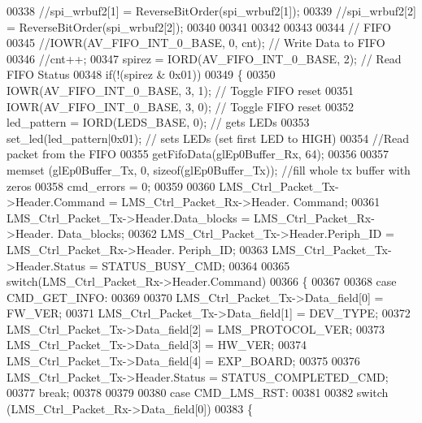 \begin{DoxyCode}
00338         \textcolor{comment}{//spi\_wrbuf2[1] = ReverseBitOrder(spi\_wrbuf2[1]);}
00339         \textcolor{comment}{//spi\_wrbuf2[2] = ReverseBitOrder(spi\_wrbuf2[2]);}
00340 
00341 
00342 
00343 
00344         \textcolor{comment}{// FIFO}
00345         \textcolor{comment}{//IOWR(AV\_FIFO\_INT\_0\_BASE, 0, cnt);     // Write Data to FIFO}
00346         \textcolor{comment}{//cnt++;}
00347         spirez = IORD(AV_FIFO_INT_0_BASE, 2);   \textcolor{comment}{// Read FIFO Status}
00348         \textcolor{keywordflow}{if}(!(spirez & 0x01))
00349         \{
00350             IOWR(AV_FIFO_INT_0_BASE, 3, 1);     \textcolor{comment}{// Toggle FIFO reset}
00351             IOWR(AV_FIFO_INT_0_BASE, 3, 0);     \textcolor{comment}{// Toggle FIFO reset}
00352             led\_pattern = IORD(LEDS_BASE, 0);   \textcolor{comment}{// gets LEDs}
00353             set_led(led\_pattern|0x01);         \textcolor{comment}{// sets LEDs (set first LED to HIGH)}
00354             \textcolor{comment}{//Read packet from the FIFO}
00355             getFifoData(glEp0Buffer_Rx, 64);
00356 
00357             memset (glEp0Buffer_Tx, 0, \textcolor{keyword}{sizeof}(glEp0Buffer_Tx)); \textcolor{comment}{//fill whole tx buffer with zeros}
00358             cmd_errors = 0;
00359 
00360             LMS\_Ctrl\_Packet\_Tx->Header.Command = LMS\_Ctrl\_Packet\_Rx->Header.
      Command;
00361             LMS\_Ctrl\_Packet\_Tx->Header.Data_blocks = LMS\_Ctrl\_Packet\_Rx->Header.
      Data_blocks;
00362             LMS\_Ctrl\_Packet\_Tx->Header.Periph_ID = LMS\_Ctrl\_Packet\_Rx->Header.
      Periph_ID;
00363             LMS\_Ctrl\_Packet\_Tx->Header.Status = STATUS_BUSY_CMD;
00364 
00365             \textcolor{keywordflow}{switch}(LMS\_Ctrl\_Packet\_Rx->Header.Command)
00366             \{
00367 
00368                 \textcolor{keywordflow}{case} CMD_GET_INFO:
00369 
00370                     LMS\_Ctrl\_Packet\_Tx->Data_field[0] = FW_VER;
00371                     LMS\_Ctrl\_Packet\_Tx->Data_field[1] = DEV_TYPE;
00372                     LMS\_Ctrl\_Packet\_Tx->Data_field[2] = LMS_PROTOCOL_VER;
00373                     LMS\_Ctrl\_Packet\_Tx->Data_field[3] = HW_VER;
00374                     LMS\_Ctrl\_Packet\_Tx->Data_field[4] = EXP_BOARD;
00375 
00376                     LMS\_Ctrl\_Packet\_Tx->Header.Status = STATUS_COMPLETED_CMD;
00377                 \textcolor{keywordflow}{break};
00378 
00379 
00380                 \textcolor{keywordflow}{case} CMD_LMS_RST:
00381 
00382                     \textcolor{keywordflow}{switch} (LMS\_Ctrl\_Packet\_Rx->Data_field[0])
00383                     \{

\end{DoxyCode}
